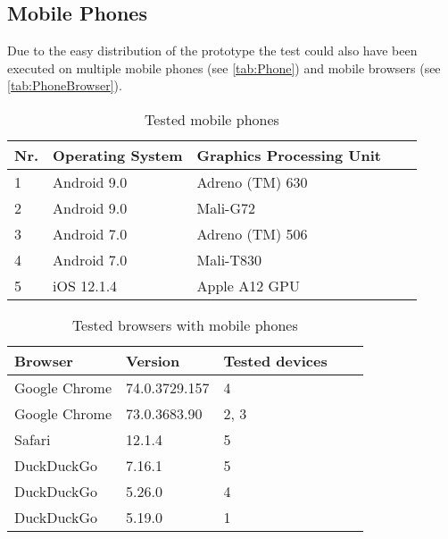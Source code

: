 \subsection{Mobile Phones}
Due to the easy distribution of the prototype the test could also have been executed on multiple mobile phones (see \autoref{tab:Phone}) and mobile browsers (see \autoref{tab:PhoneBrowser}).

\begin{table}[h]
	\centering
	\begin{tabular}{lllll}
		Nr. & Operating System & Graphics Processing Unit \\ \hline
		\rule{0pt}{15pt}1 & Android 9.0 & Adreno (TM) 630 \\
		2 & Android 9.0 & Mali-G72  \\
		3 & Android 7.0 & Adreno (TM) 506 \\
		4 & Android 7.0 & Mali-T830 \\
		5 & iOS 12.1.4 & Apple A12 GPU 
	\end{tabular}
\caption{Tested mobile phones}
\label{tab:Phone}
\end{table}


\begin{table}[h]
	\centering
	\begin{tabular}{lllll}
		Browser & Version & Tested devices \\ \hline
		\rule{0pt}{15pt}Google Chrome & 74.0.3729.157 & 4 \\
		Google Chrome & 73.0.3683.90 & 2, 3  \\
		Safari & 12.1.4 & 5 \\
		DuckDuckGo & 7.16.1 & 5 \\
		DuckDuckGo & 5.26.0 & 4 \\
		DuckDuckGo & 5.19.0 & 1 
	\end{tabular}
	\caption{Tested browsers with mobile phones}
	\label{tab:PhoneBrowser}
\end{table}

